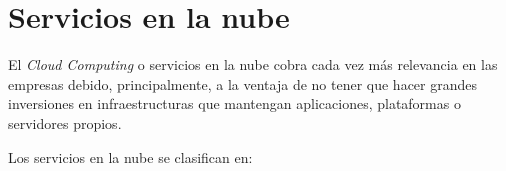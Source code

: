









\section{Servicios en la nube}

El \emph{Cloud Computing} o servicios en la nube cobra cada vez más relevancia en las empresas debido, principalmente, a la ventaja de no tener que hacer grandes inversiones en infraestructuras que mantengan aplicaciones, plataformas o servidores propios.

Los servicios en la nube se clasifican en:

